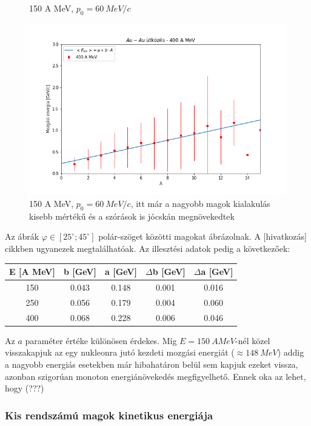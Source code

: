 \documentclass[a4paper,12pt]{article}
\begin{document}
\begin{figure}[!htb]
\begin{minipage}{.49\textwidth}
    \caption{150 A MeV, $p_{0} = 60 ~MeV/c$}
\end{minipage}
\begin{minipage}[c]{.8\textwidth}
\centering
    \includegraphics[width=\textwidth]{./400AMeV006mom2000adat.png}
    \caption{150 A MeV, $p_{0} = 60 ~MeV/c$, itt már a nagyobb magok kialakulás kisebb mértékű és a szórások is jócskán megnövekedtek}
\end{minipage}
\end{figure}

\par Az ábrák $\varphi \in [25^{\circ}; 45^{\circ}]$ polár-szöget közötti magokat ábrázolnak. A [hivatkozás] cikkben ugyanezek megtalálhatóak. Az illesztési adatok pedig a következőek:

\vspace{5mm}

\begin{center}
\begin{tabular}{|c|c|c|c|c|}
\hline
E [A MeV] & b [GeV] & a [GeV] & $\Delta$b [GeV] & $\Delta$a [GeV] \\
\hline
150 & 0.043 & 0.148 & 0.001 & 0.016 \\
\hline
250 & 0.056 & 0.179 & 0.004 & 0.060 \\
\hline
400 & 0.068 & 0.228 & 0.006 & 0.046 \\
\hline
\end{tabular}
\end{center}

\vspace{5mm}

\par Az $a$ paraméter értéke különösen érdekes. Míg $E = 150 ~A MeV$-nél közel visszakapjuk az egy nukleonra jutó kezdeti mozgási energiát ($\approx 148 ~MeV$) addig a nagyobb energiás esetekben már hibahatáron belül sem kapjuk ezeket vissza, azonban szigorúan monoton energiánövekedés megfigyelhető. Ennek oka az lehet, hogy (???)

\vspace{5mm}

\subsubsection{ Kis rendszámú magok kinetikus energiája}

\vspace{5mm}
\end{document}
